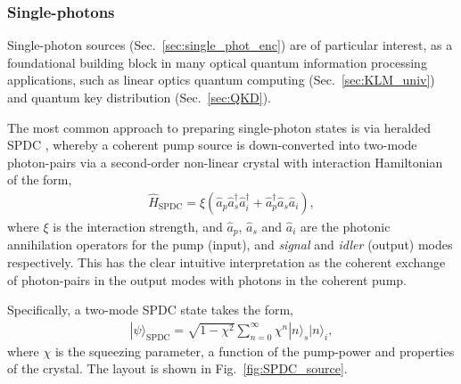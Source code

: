 \documentclass[aps,rmp,twocolumn,amsmath,amssymb,nofootinbib,superscriptaddress,longbibliography,floatfix,table-of-contents,eqsecnum]{revtex4-1}
\newcommand{\ket}[1]{|#1\rangle}
\begin{document}
%
%

\subsubsection{Single-photons} \label{sec:single_phot_src} 

Single-photon sources (Sec.~\ref{sec:single_phot_enc}) \cite{bib:Oxborrow05} are of particular interest, as a foundational building block in many optical quantum information processing applications, such as linear optics quantum computing (Sec.~\ref{sec:KLM_univ}) and quantum key distribution (Sec.~\ref{sec:QKD}).

The most common approach to preparing single-photon states is via heralded SPDC \cite{bib:URen03, bib:URen05}, whereby a coherent pump source is down-converted into two-mode photon-pairs via a second-order non-linear crystal with interaction Hamiltonian of the form,
\begin{align}
\hat{H}_\text{SPDC} = \xi(\hat{a}_p\hat{a}_s^\dag\hat{a}_i^\dag + \hat{a}_p^\dag\hat{a}_s\hat{a}_i),
\end{align}
where $\xi$ is the interaction strength, and $\hat{a}_p$, $\hat{a}_s$ and $\hat{a}_i$ are the photonic annihilation operators for the pump (input), and \textit{signal} and \textit{idler} (output) modes respectively. This has the clear intuitive interpretation as the coherent exchange of photon-pairs in the output modes with photons in the coherent pump.

Specifically, a two-mode SPDC state takes the form,
\begin{align}
\ket\psi_\text{SPDC} = \sqrt{1-\chi^2} \sum_{n=0}^\infty \chi^n \ket{n}_s\ket{n}_i,
\end{align}
where $\chi$ is the squeezing parameter, a function of the pump-power and properties of the crystal. The layout is shown in Fig.~\ref{fig:SPDC_source}.
\end{document}
